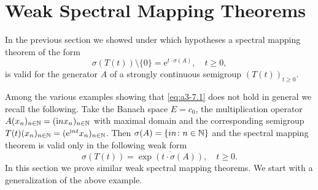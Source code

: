\section{Weak Spectral Mapping Theorems}\label{sec:a3-7}%
In the previous section we showed under which hypotheses a spectral mapping theorem of the form
\begin{equation}\label{eq:a3-7.1}
	\sigma(T(t)) \setminus \{0\} = \mathrm{e}^{t \cdot \sigma(A)}, \quad t \geq 0 ,
\end{equation}
is valid for the generator $A$ of a strongly continuous semigroup $(T(t))_{t\geq 0}$.

Among the various examples showing that \eqref{eq:a3-7.1} does not hold in general we recall the following.
Take the Banach space $E = c_{0}$, the multiplication operator $A(x_{n})_{n\in\mathbb{N}} = (\mathrm{i} n x_{n})_{n\in\mathbb{N}}$ with maximal domain and the corresponding semigroup $T(t)(x_{n})_{n \in \mathbb{N}} = 
(\mathrm{e}^{\mathrm{i} nt}x_{n})_{n \in \mathbb{N}}$.
Then $\sigma(A) = \{in \colon n \in \mathbb{N}\}$ and the spectral mapping theorem is valid only in the following weak form
\begin{equation}\label{eq:a3-7.2}
	\sigma(T(t)) = \overline{\exp(t\cdot\sigma(A))}, \quad t \geq 0 .
\end{equation}
In this section we prove similar weak spectral mapping theorems.
We start with a generalization of the above example.

